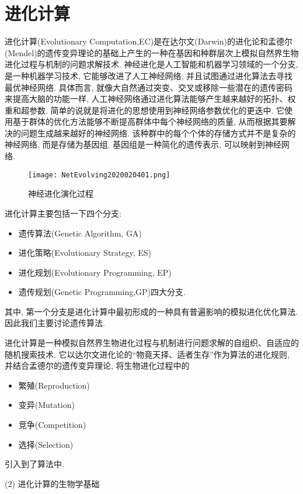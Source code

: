 {\section{进化计算}
进化计算(Evolutionary Computation,EC)是在达尔文(Darwin)的进化论和孟德尔(Mendel)的遗传变异理论的基础上产生的一种在基因和种群层次上模拟自然界生物进化过程与机制的问题求解技术.
神经进化是人工智能和机器学习领域的一个分支, 是一种机器学习技术, 它能够改进了人工神经网络, 并且试图通过进化算法去寻找最优神经网络. 具体而言, 就像大自然通过突变、交叉或移除一些潜在的遗传密码来提高大脑的功能一样, 人工神经网络通过进化算法能够产生越来越好的拓扑、权重和超参数. 简单的说就是将进化的思想使用到神经网络参数优化的更迭中. 它使用基于群体的优化方法能够不断提高群体中每个神经网络的质量, 从而根据其要解决的问题生成越来越好的神经网络. 该种群中的每个个体的存储方式并不是复杂的神经网络, 而是存储为基因组. 基因组是一种简化的遗传表示, 可以映射到神经网络.
\begin{figure}[H]
\centering
\texttt{[image: NetEvolving2020020401.png]}
\caption{神经进化演化过程}
\label{NetEvolving2020020401}
\end{figure}

进化计算主要包括一下四个分支:
\begin{itemize}
\item 遗传算法(Genetic Algorithm, GA)
\item 进化策略(Evolutionary Strategy, ES)
\item 进化规划(Evolutionary Programming, EP)
\item 遗传规划(Genetic Programming,GP)四大分支.
\end{itemize}
其中, 第一个分支是进化计算中最初形成的一种具有普遍影响的模拟进化优化算法. 因此我们主要讨论遗传算法.

进化计算是一种模拟自然界生物进化过程与机制进行问题求解的自组织、自适应的随机搜索技术. 它以达尔文进化论的“物竟天择、适者生存”作为算法的进化规则, 并结合孟德尔的遗传变异理论, 将生物进化过程中的
\begin{itemize}
\item 繁殖(Reproduction)
\item 变异(Mutation)
\item 竞争(Competition)
\item 选择(Selection)
\end{itemize}
引入到了算法中.

  (2) 进化计算的生物学基础

}
